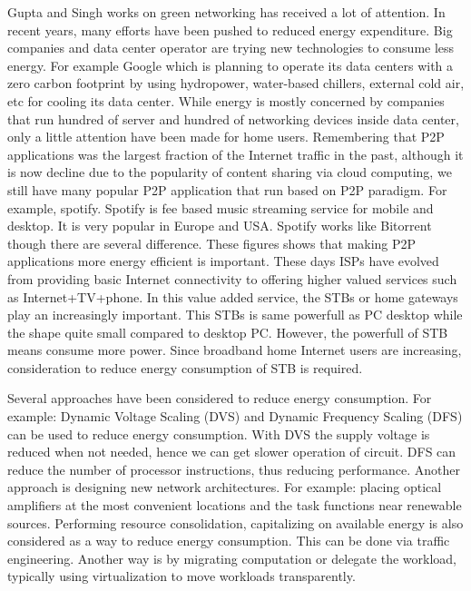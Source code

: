 Gupta and Singh \cite{Gupta:2003:GI:863955.863959} works on green networking has received a lot of attention.
In recent years, many efforts have been pushed to reduced energy expenditure.
Big companies and data center operator are trying new technologies to consume less energy.
For example Google which is planning to operate its data centers with a zero carbon footprint by using hydropower, water-based chillers, external cold air, etc for cooling its data center.
While energy is mostly concerned by companies that run hundred of server and hundred of networking devices inside data center, only a little attention have been made for home users. 
Remembering that P2P applications was the largest fraction of the Internet traffic in the past, although it is now decline due to the popularity of content sharing via cloud computing, we still have many popular P2P application that run based on P2P paradigm.  
For example, spotify.
Spotify is fee based music streaming service for mobile and desktop. 
It is very popular in Europe and USA. 
Spotify works like Bitorrent though there are several difference.
These figures shows that making P2P applications more energy efficient is important.
These days ISPs have evolved from providing basic Internet connectivity to offering higher valued services such as Internet+TV+phone.
In this value added service, the STBs or home gateways play an increasingly important. 
This STBs is same powerfull as PC desktop while the shape quite small compared to desktop PC. 
However, the powerfull of STB means consume more power. 
Since broadband home Internet users are increasing, consideration to reduce energy consumption of STB is required. 

Several approaches have been considered to reduce energy consumption. 
For example: Dynamic Voltage Scaling (DVS) and Dynamic Frequency Scaling (DFS) can be used to reduce energy consumption.
With DVS the supply voltage is reduced when not needed, hence we can get slower operation of circuit.
DFS can reduce the number of processor instructions, thus reducing performance.
Another approach is designing new network architectures.
For example: placing optical amplifiers at the most convenient locations and the task functions near renewable sources.
Performing resource consolidation, capitalizing on available energy is also considered as a way to reduce energy consumption.
This can be done via traffic engineering. 
Another way is by migrating computation or delegate the workload, typically using virtualization to move workloads transparently.

